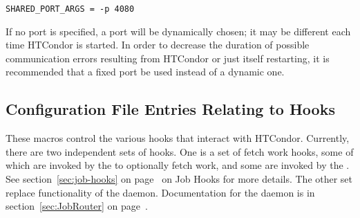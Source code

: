 \begin{description}
\begin{verbatim}
SHARED_PORT_ARGS = -p 4080
\end{verbatim}

If no port is specified, a port will be dynamically chosen; it may be
different each time HTCondor is started.  In order to decrease the
duration of possible communication errors resulting from HTCondor or just
 itself restarting, it is recommended that a fixed
port be used instead of a dynamic one.
\end{description}

\subsection{\label{sec:Config-hooks}Configuration File Entries Relating to Hooks}

These macros control the various hooks that interact with HTCondor.
Currently, there are two independent sets of hooks.
One is a set of fetch work hooks, some of which are invoked by
the  to optionally fetch work,
and some are invoked by the .
See section~\ref{sec:job-hooks} on page~\pageref{sec:job-hooks} on
Job Hooks for more details.
The other set replace functionality of the  daemon.
Documentation for the  daemon is in
section~\ref{sec:JobRouter} on page~\pageref{sec:JobRouter}.

